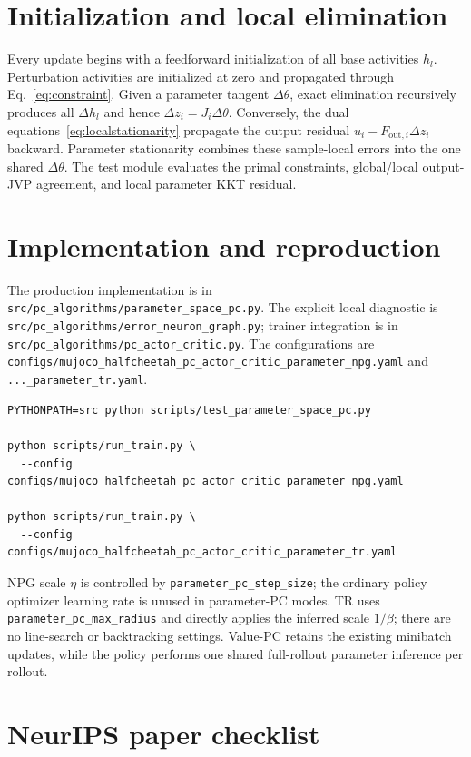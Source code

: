 \documentclass{article}
\newcommand{\Fouti}{F_{\mathrm{out},i}}
\newcommand{\code}[1]{\texttt{#1}}
\begin{document}
\section{Initialization and local elimination}

Every update begins with a feedforward initialization of all base activities $h_l$. Perturbation activities are initialized at zero and propagated through Eq.~\eqref{eq:constraint}. Given a parameter tangent $\Delta\theta$, exact elimination recursively produces all $\Delta h_l$ and hence $\Delta z_i=J_i\Delta\theta$. Conversely, the dual equations~\eqref{eq:localstationarity} propagate the output residual $u_i-\Fouti\Delta z_i$ backward. Parameter stationarity combines these sample-local errors into the one shared $\Delta\theta$. The test module evaluates the primal constraints, global/local output-JVP agreement, and local parameter KKT residual.

\section{Implementation and reproduction}

The production implementation is in \code{src/pc\_algorithms/parameter\_space\_pc.py}. The explicit local diagnostic is \code{src/pc\_algorithms/error\_neuron\_graph.py}; trainer integration is in \code{src/pc\_algorithms/pc\_actor\_critic.py}. The configurations are \code{configs/mujoco\_halfcheetah\_pc\_actor\_critic\_parameter\_npg.yaml} and \code{...\_parameter\_tr.yaml}.

\begin{verbatim}
PYTHONPATH=src python scripts/test_parameter_space_pc.py

python scripts/run_train.py \
  --config configs/mujoco_halfcheetah_pc_actor_critic_parameter_npg.yaml

python scripts/run_train.py \
  --config configs/mujoco_halfcheetah_pc_actor_critic_parameter_tr.yaml
\end{verbatim}

NPG scale $\eta$ is controlled by \code{parameter\_pc\_step\_size}; the ordinary policy optimizer learning rate is unused in parameter-PC modes. TR uses \code{parameter\_pc\_max\_radius} and directly applies the inferred scale $1/\beta$; there are no line-search or backtracking settings. Value-PC retains the existing minibatch updates, while the policy performs one shared full-rollout parameter inference per rollout.

\section*{NeurIPS paper checklist}
\end{document}
